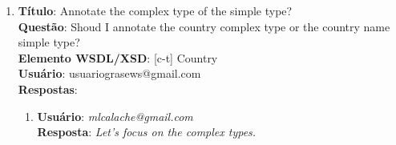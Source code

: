 \begin{tcolorbox}
\begin{enumerate}[label=(Q\arabic*)]
        \item 
        \textbf{Título}: Annotate the complex type of the simple type?
        \\
        \textbf{Questão}: Shoud I annotate the country complex type or the country name simple type?
        \\
        \textbf{Elemento WSDL/XSD}: [c-t] Country
        \\
        \textbf{Usuário}: usuariograsews@gmail.com
        \\
        \textbf{Respostas}:
        \begin{enumerate}
            \item
                \textbf{Usuário}: \textit{mlcalache@gmail.com}
                \\
                \textbf{Resposta}: \textit{Let's focus on the complex types.}
        \end{enumerate}
        
        
    \setlength{\parskip}{0.2cm}
        
    \end{enumerate}
\end{tcolorbox}

